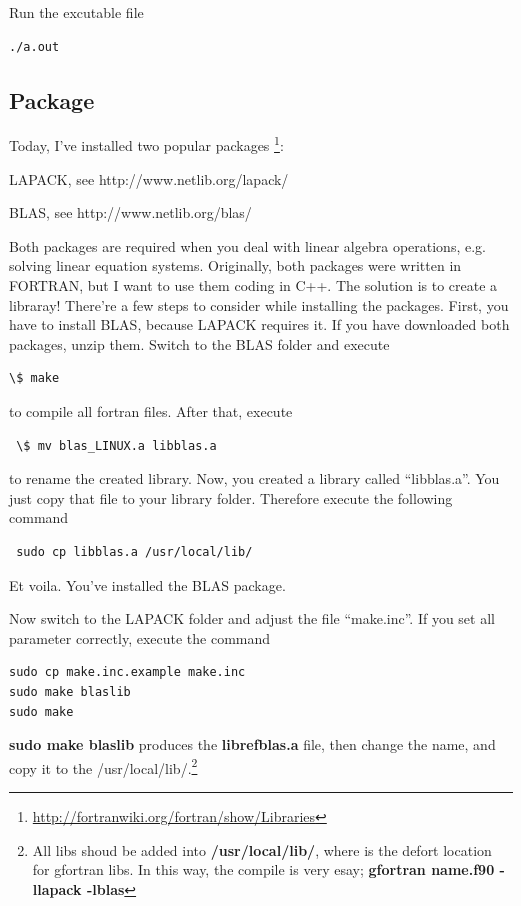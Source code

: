 Run the excutable file
\begin{verbatim}
./a.out
\end{verbatim}


\subsection{Package }

Today, I’ve installed two popular packages \footnote{ \url{http://fortranwiki.org/fortran/show/Libraries}}:

LAPACK, see http://www.netlib.org/lapack/

BLAS, see http://www.netlib.org/blas/

Both packages are required when you deal with linear algebra operations, e.g. solving linear equation systems. Originally, both packages were written in FORTRAN, but I want to use them coding in C++. The solution is to create a libraray! There’re a few steps to consider while installing the packages. First, you have to install BLAS, because LAPACK requires it. If you have downloaded both packages, unzip them. Switch to the BLAS folder and execute
\begin{verbatim}
\$ make
\end{verbatim}
to compile all fortran files. After that, execute

\begin{verbatim}
 \$ mv blas_LINUX.a libblas.a
\end{verbatim}
to rename the created library. Now, you created a library called “libblas.a”. You just copy that file to your library folder. Therefore execute the following command

\begin{verbatim}
 sudo cp libblas.a /usr/local/lib/
\end{verbatim}
Et voila. You’ve installed the BLAS package. 

Now switch to the LAPACK folder and adjust the file “make.inc”. If you set all parameter correctly, execute the command

\begin{verbatim}
sudo cp make.inc.example make.inc
sudo make blaslib
sudo make
\end{verbatim}

\textbf{sudo make blaslib} produces the \textbf{librefblas.a} file, then change the name, and copy it to the /usr/local/lib/.\footnote{All libs shoud be added into \textbf{/usr/local/lib/}, where is the defort location for gfortran libs. In this way, the compile is very esay; \textbf{gfortran name.f90 -llapack -lblas}}


